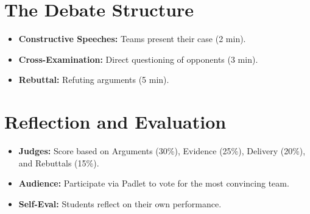 \documentclass[11pt, a4paper]{article}
\begin{document}
\section{The Debate Structure}
\begin{itemize}
    \item \textbf{Constructive Speeches:} Teams present their case (2 min).
    \item \textbf{Cross-Examination:} Direct questioning of opponents (3 min).
    \item \textbf{Rebuttal:} Refuting arguments (5 min).
\end{itemize}

\section{Reflection and Evaluation}
\begin{itemize}
    \item \textbf{Judges:} Score based on Arguments (30\%), Evidence (25\%), Delivery (20\%), and Rebuttals (15\%).
    \item \textbf{Audience:} Participate via Padlet to vote for the most convincing team.
    \item \textbf{Self-Eval:} Students reflect on their own performance.
\end{itemize}
\end{document}
